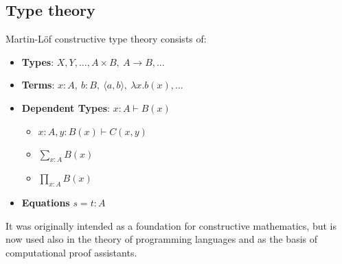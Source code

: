\documentclass[11pt]{article}
\newcommand{\myemph}[1]{\textbf{#1}}    %
\begin{document}
\subsection*{Type theory}

Martin-L\"of constructive type theory consists of:
%
\begin{itemize}
\item \myemph{Types}: $X, Y, \ldots, A\times B,\ A\rightarrow B, \ldots$
\item \myemph{Terms}: $x: A,\ b: B,\ \langle a,b\rangle,\ \lambda x. b(x), \ldots$
\item \myemph{Dependent Types}: $x:A\vdash B(x)$
\begin{itemize}
	\item $x:A, y:B(x)\vdash C(x,y)$
	\item $\sum_{x:A} B(x)$
	\item $\prod_{x:A} B(x)$
	\end{itemize}	
\item \myemph{Equations} $s = t : A$ %
\end{itemize}
\medskip
%
%

It was originally intended as a foundation for constructive mathematics, but is now used also in the theory of programming languages and as the basis of computational proof assistants.
%
%



\end{document}
